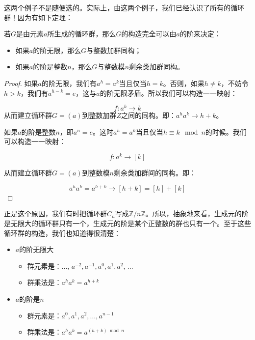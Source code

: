 \documentclass[b5paper]{ctexart}
\begin{document}
这两个例子不是随便选的。实际上，由这两个例子，我们已经认识了所有的循环群！因为有如下定理：

\begin{theorem}
若$G$是由元素$a$所生成的循环群，那么$G$的构造完全可以由$a$的阶来决定：
\begin{itemize}
\item 如果$a$的阶无限，那么$G$与整数加群同构；
\item 如果$a$的阶是整数$n$，那么$G$与整数模$n$剩余类加群同构。
\end{itemize}
\end{theorem}

\begin{proof}
如果$a$的阶无限，我们有$a^h = a^k$当且仅当$h = k$。否则，如果$h \neq k$，不妨令$h > k$，我们有$a^{h - k} = e$，这与$a$的阶无限矛盾。所以我们可以构造一一映射：

\[
f: a^k \to k
\]
从而建立循环群$G=(a)$到整数加群$Z$之间的同构。即：$a^ha^k \to h + k$。

如果$a$的阶是整数$n$，即$a^n = e$。这时$a^h = a^k$当且仅当$h \equiv k \mod n$的时候。我们可以构造一一映射：

\[
f: a^k \to [k]
\]

从而建立循环群$G = (a)$到整数模$n$剩余类加群间的同构。即：

\[
a^ha^k = a^{h + k} \to [h + k] = [h] + [k]
\]
\end{proof}

正是这个原因，我们有时把循环群$C_n$写成$\mathbb{Z}/n\mathbb{Z}$。所以，抽象地来看，生成元的阶是无限大的循环群只有一个，生成元的阶是某个正整数的群也只有一个。至于这些循环群的构造，我们也知道得很清楚：

\begin{itemize}
\item $a$的阶无限大
  \begin{itemize}
  \item 群元素是：..., $a^{-2}, a^{-1}, a^0, a^1, a^2$, ...
  \item 群乘法是：$a^ha^k = a^{h + k}$
  \end{itemize}
\item $a$的阶是$n$
  \begin{itemize}
  \item 群元素是：$a^0, a^1, a^2, ..., a^{n-1}$
  \item 群乘法是：$a^ha^k = a^{(h + k) \bmod n}$
  \end{itemize}
\end{itemize}
\end{document}
